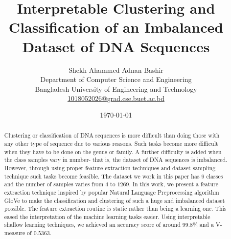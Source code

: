 \documentclass[oneside, twocolumn, a4paper, 10pt]{IEEEtran}
\begin{document}
\title{Interpretable Clustering and Classification of an Imbalanced Dataset of DNA Sequences}
\author{Shekh Ahammed Adnan Bashir \\ Department of Computer Science and Engineering \\ Bangladesh University of Engineering and Technology \\ \url{1018052026@grad.cse.buet.ac.bd}}
\date{\today}
\maketitle

\begin{abstract}
Clustering or classification of DNA sequences is more difficult than doing those with any other type of sequence due to various reasons. Such tasks become more difficult when they have to be done on the genus or family. A further difficulty is added when the class samples vary in number- that is, the dataset of DNA sequences is imbalanced. However, through using proper feature extraction techniques and dataset sampling technique such tasks become feasible. The dataset we work in this paper has $9$ classes and the number of samples varies from $4$ to $1269$. In this work, we present a feature extraction technique inspired by popular Natural Language Preprocessing algorithm GloVe \cite{1} to make the classification and clustering of such a huge and imbalanced dataset possible. The feature extraction routine is static rather than being a learning one. This eased the interpretation of the machine learning tasks easier. Using interpretable shallow learning techniques, we achieved an accuracy score of around $99.8$\% and a V-measure of $0.5363$.
\end{abstract}
\end{document}
